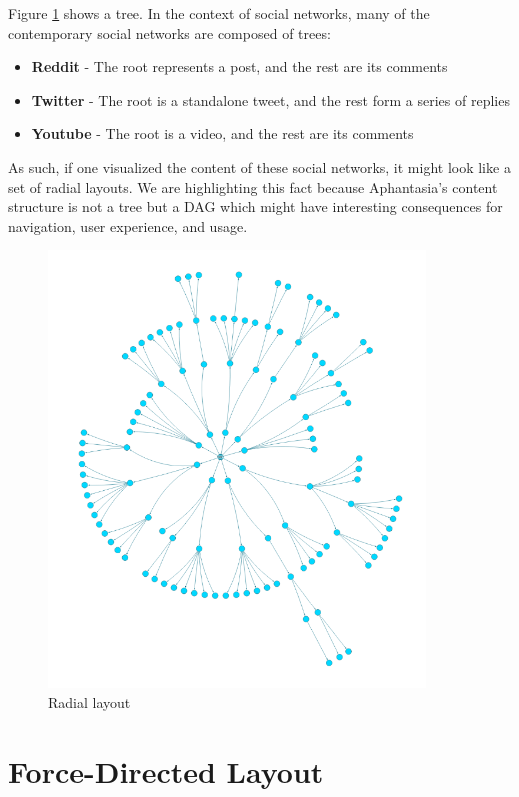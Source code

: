 Figure \ref{obr:graph_layout_radial} shows a tree.
In the context of social networks, many of the contemporary social networks are composed of trees:
\begin{itemize}
    \item \textbf{Reddit} - The root represents a post, and the rest are its comments
    \item \textbf{Twitter} - The root is a standalone tweet, and the rest form a series of replies
    \item \textbf{Youtube} - The root is a video, and the rest are its comments
\end{itemize}

As such, if one visualized the content of these social networks, it might look like a set of radial layouts.
We are highlighting this fact because Aphantasia's content structure is not a \gls{tree} but a \gls{DAG}
which might have interesting consequences for navigation, user experience, and usage.

\begin{figure}[h]\centering
    \includegraphics[width=100mm, keepaspectratio]{img/graph_layout_radial.png}
    \caption{Radial layout\cite{graph_layout_demos}}
    \label{obr:graph_layout_radial}
\end{figure}

\section{Force-Directed Layout}
\label{sec:force_directed_layout}

